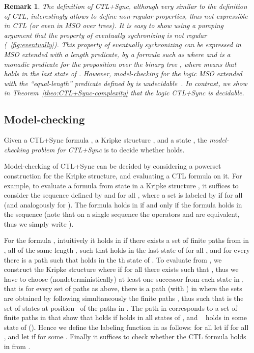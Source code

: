 \documentclass{article}
\newtheorem{remark}{Remark}
\begin{document}
\begin{remark}\label{rmk:not-regular}
The definition of CTL+Sync, although very similar to the definition of CTL,
interestingly allows to define non-regular properties, thus not expressible in CTL (or even in MSO over trees).
It is easy to show using a pumping argument that the property  
of eventually sychronizing is not regular (\figurename~\ref{fig:eventually}).
This property of eventually sychronizing can be expressed in MSO extended with
a length predicate, by a formula such as  where  and  is a monadic predicate 
for the proposition  over the binary tree , where  means that  holds in the last state of .
However, model-checking for the logic MSO extended with the ``equal-length'' predicate  defined by
 is undecidable~\cite[Theorem 11.6]{Thomas90}.
In contrast, we show in Theorem~\ref{theo:CTL+Sync-complexity} that the logic CTL+Sync is decidable.
\end{remark}


\subsection{Model-checking}\label{sec:mc}

Given a CTL+Sync formula , a Kripke structure , and a state , 
the \emph{model-checking problem for CTL+Sync} is to decide whether  holds.

Model-checking of CTL+Sync can be decided by considering a powerset construction for
the Kripke structure, and evaluating a CTL formula on it. 
For example, to evaluate a formula  from state  in a Kripke structure , 
it suffices to consider the sequence  defined by 
and  for all , where a set  is labeled by 
if  for all  (and analogously for ).
The formula  holds in  if and only if 
the formula  holds in the sequence 
(note that on a single sequence the operators  and  are 
equivalent, thus we simply write ).


For the formula , intuitively it 
holds in  if there exists a set  of finite paths  
from  in , all of the same length , such that  holds in the last state of 
for all , and for every  there is a path  such that 
 holds in the th state of . 
To evaluate  from , we construct
the Kripke structure 
where  if for all  there exists  such that
, thus we have to choose (nondeterministically) at least one 
successor from each state in , that is
for every set  of paths  as above,
there is a path  (with ) in 
where the sets  are obtained by following simultaneously the 
finite paths , thus such that  is the set of states at position~
of the paths in .
The path  in  corresponds to a set  of finite paths in 
that show that  holds if   holds in all states 
of , and ~ holds in some state of  ().
Hence we define the labeling function  in  as follows: 
for all  
let  if  for all , and
let  if  for some .
Finally it suffices to check whether the CTL formula  holds in  from .
\end{document}
